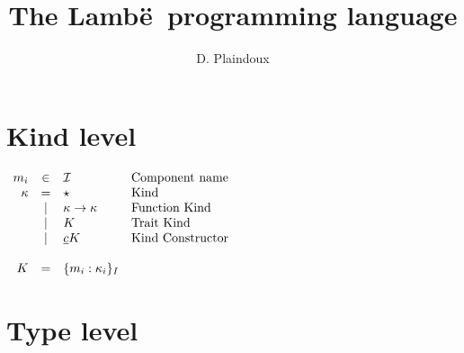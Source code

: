 \documentclass{article}[11pt]
\newcommand{\lambe}[0]{{\sf Lamb\"e~}}
\begin{document}
    \title{The \lambe programming language}
    \author{D. Plaindoux}

    \maketitle


    \section{Kind level}\label{sec:kind-level}

    \begin{math}
        \begin{array}{rclp{5cm}}
            m_i    & \in  & {\cal I}                  & Component name \\
            \kappa
            & =    & \star                     & Kind              \\
            & \mid & \kappa \rightarrow \kappa & Function Kind     \\
            & \mid & K                         & Trait Kind        \\
            & \mid & \underline{c} K           & Kind Constructor  \\
            \\
            K & =                  & \{ m_i:\kappa_i \}_I \\
        \end{array}
    \end{math}


    \section{Type level}\label{sec:type-level}
\end{document}
